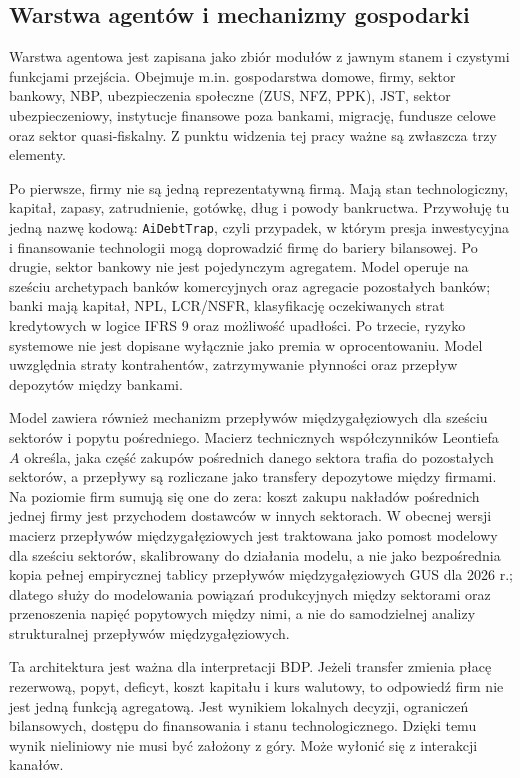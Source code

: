 \subsection{Warstwa agentów i mechanizmy gospodarki}

Warstwa agentowa \amor{} jest zapisana jako zbiór modułów z jawnym stanem i czystymi funkcjami przejścia. Obejmuje m.in. gospodarstwa domowe, firmy, sektor bankowy, NBP, ubezpieczenia społeczne (ZUS, NFZ, PPK), JST, sektor ubezpieczeniowy, instytucje finansowe poza bankami, migrację, fundusze celowe oraz sektor quasi-fiskalny. Z punktu widzenia tej pracy ważne są zwłaszcza trzy elementy.

Po pierwsze, firmy nie są jedną reprezentatywną firmą. Mają stan technologiczny, kapitał, zapasy, zatrudnienie, gotówkę, dług i powody bankructwa. Przywołuję tu jedną nazwę kodową: \texttt{AiDebtTrap}, czyli przypadek, w którym presja inwestycyjna i finansowanie technologii mogą doprowadzić firmę do bariery bilansowej. Po drugie, sektor bankowy nie jest pojedynczym agregatem. Model operuje na sześciu archetypach banków komercyjnych oraz agregacie pozostałych banków; banki mają kapitał, NPL, LCR/NSFR, klasyfikację oczekiwanych strat kredytowych w logice IFRS 9 oraz możliwość upadłości. Po trzecie, ryzyko systemowe nie jest dopisane wyłącznie jako premia w oprocentowaniu. Model uwzględnia straty kontrahentów, zatrzymywanie płynności oraz przepływ depozytów między bankami.

Model zawiera również mechanizm przepływów międzygałęziowych dla sześciu sektorów i popytu pośredniego. Macierz technicznych współczynników Leontiefa \(A\) określa, jaka część zakupów pośrednich danego sektora trafia do pozostałych sektorów, a przepływy są rozliczane jako transfery depozytowe między firmami. Na poziomie firm sumują się one do zera: koszt zakupu nakładów pośrednich jednej firmy jest przychodem dostawców w innych sektorach. W obecnej wersji macierz przepływów międzygałęziowych jest traktowana jako pomost modelowy dla sześciu sektorów, skalibrowany do działania modelu, a nie jako bezpośrednia kopia pełnej empirycznej tablicy przepływów międzygałęziowych GUS dla 2026 r.; dlatego służy do modelowania powiązań produkcyjnych między sektorami oraz przenoszenia napięć popytowych między nimi, a nie do samodzielnej analizy strukturalnej przepływów międzygałęziowych.

Ta architektura jest ważna dla interpretacji BDP. Jeżeli transfer zmienia płacę rezerwową, popyt, deficyt, koszt kapitału i kurs walutowy, to odpowiedź firm nie jest jedną funkcją agregatową. Jest wynikiem lokalnych decyzji, ograniczeń bilansowych, dostępu do finansowania i stanu technologicznego. Dzięki temu wynik nieliniowy nie musi być założony z góry. Może wyłonić się z interakcji kanałów.

